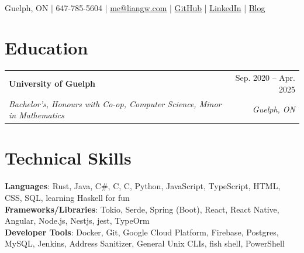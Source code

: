 \documentclass[letterpaper, 10pt]{report}
\makeatletter
\newcommand{\resumeSubheading}[4]{
    \begin{tabular*}{\textwidth}[t]{l@{\extracolsep{\fill}}r}
        \textbf{#1}       & #2                \\
        \textit{\small#3} & \textit{\small#4} \\
    \end{tabular*}\vspace{-0.7em}
}
\newcommand{\cxx}{C\nolinebreak\hspace{-.05em}\raisebox{0.03ex}{\bf +}\nolinebreak\hspace{-.05em}\raisebox{.03ex}{\bf +}}
\makeatother
\begin{document}
\begin{center}
    \textbf{\HUGE\color{Pink}{Liang Wang}} \\ \vspace{1.5em}
    \small Guelph, ON |
    647-785-5604 |
    \href{mailto:me@liangw.com}{{me@liangw.com}}  |
    \href{https://github.com/Internal-Compiler-Error}{{GitHub}} |
    \href{https://www.linkedin.com/in/liang-wang-225607174/}{{LinkedIn}} |
    \href{https://internal-compiler-error.com}{{Blog}} \\
\end{center}

\section{Education}
\resumeSubheading{University of Guelph}{Sep. 2020 -- Apr. 2025}{Bachelor's, Honours with Co-op, Computer Science, Minor in Mathematics}{Guelph, ON}


\section{Technical Skills}
\vspace{0.1em}
\begin{itemize}[leftmargin=0em, label={}]
    \small{\item{
        \textbf{Languages}{: Rust, Java, C\#, \cxx, C, Python, JavaScript, TypeScript, HTML, CSS, SQL, learning Haskell for fun} \\
        \textbf{Frameworks/Libraries}{: Tokio, Serde, Spring (Boot), React, React Native, Angular, Node.js, Nestjs, jest, TypeOrm} \\
        \textbf{Developer Tools}{: Docker, Git, Google Cloud Platform, Firebase, Postgres, MySQL, Jenkins, Address Sanitizer, General Unix CLIs, fish shell, PowerShell} \\
    }}
\end{itemize}
\end{document}
